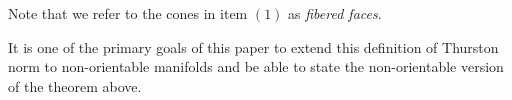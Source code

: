 Note that we refer to the cones in item $(1)$ as \textit{fibered faces}.

It is one of the primary goals of this paper to extend this definition of Thurston norm to non-orientable manifolds and be able to state the non-orientable version of the theorem above. 





